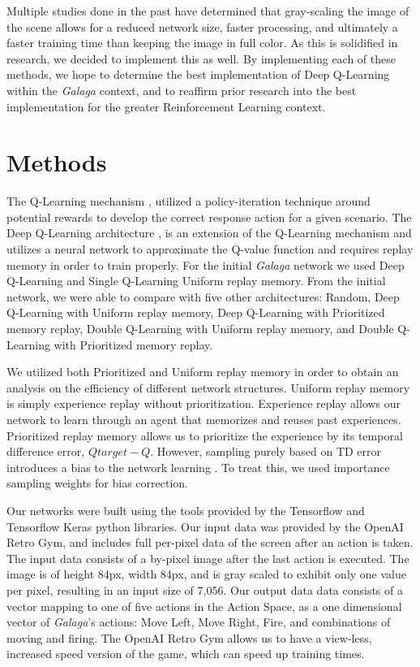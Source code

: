 \documentclass[conference]{IEEEtran}
\begin{document}
Multiple studies done in the past have determined that gray-scaling the image of the scene allows for a reduced network size, faster processing, and ultimately a faster training time than keeping the image in full color. As this is solidified in research, we decided to implement this as well.
By implementing each of these methods, we hope to determine the best implementation of Deep Q-Learning within the \textit{Galaga} context, and to reaffirm prior research into the best implementation for the greater Reinforcement Learning context.

\section{Methods}
The Q-Learning mechanism \cite{Watkins1989}, utilized a policy-iteration technique around potential rewards to develop the correct response action for a given scenario. The Deep Q-Learning architecture \cite{Mnih2015}, is an extension of the Q-Learning mechanism and utilizes a neural network to approximate the Q-value function and requires replay memory in order to train properly. For the initial \textit{Galaga} network we used Deep Q-Learning and Single Q-Learning Uniform replay memory. From the initial network, we were able to compare with five other architectures: Random, Deep Q-Learning with Uniform replay memory, Deep Q-Learning with Prioritized memory replay, Double Q-Learning with Uniform replay memory, and Double Q-Learning with Prioritized memory replay.  \par
We utilized both Prioritized and Uniform replay memory in order to obtain an analysis on the efficiency of different network structures. Uniform replay memory is simply experience replay without prioritization. Experience replay allows our network to learn through an agent that memorizes and reuses past experiences.  Prioritized replay memory allows us to prioritize the experience by its temporal difference error, $Q{target} - Q$. However, sampling purely based on TD error introduces a bias to the network learning \cite{schaul2015prioritized}. To treat this, we used importance sampling weights for bias correction. \par
Our networks were built using the tools provided by the Tensorflow and Tensorflow Keras python libraries. Our input data was provided by the OpenAI Retro Gym, and includes full per-pixel data of the screen after an action is taken. The input data consists of a by-pixel image after the last action is executed. The image is of height 84px, width 84px, and is gray scaled to exhibit only one value per pixel, resulting in an input size of 7,056. Our output data data consists of a vector mapping to one of five actions in the Action Space, as a one dimensional vector of \textit{Galaga}'s actions: Move Left, Move Right, Fire, and combinations of moving and firing. The OpenAI Retro Gym allows us to have a view-less, increased speed version of the game, which can speed up training times.\par
\end{document}
